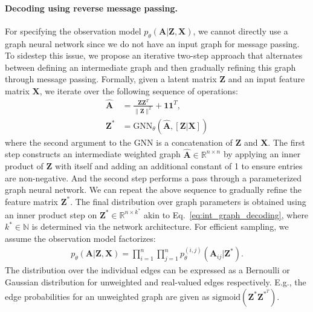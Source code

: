 \documentclass{article}
\begin{document}
\paragraph{Decoding using reverse message passing.} For specifying the observation model $p_\theta(\mathbf{A} \vert \mathbf{Z}, \mathbf{X})$, we cannot directly use a graph neural network since we do not have an input graph for message passing. To sidestep this issue, we propose an iterative two-step approach that alternates between defining an intermediate graph and then gradually refining this graph through message passing.
Formally, given a latent matrix $\mathbf{Z}$ and an input feature matrix $\mathbf{X}$, we iterate over the following sequence of operations:
\begin{align}
\widehat{\mathbf{A}} &= \frac{\mathbf{Z} \mathbf{Z}^T}{\lVert \mathbf{Z} \rVert^2} + \mathbf{1}\mathbf{1}^T,\label{eq:int_graph_decoding}\\
\mathbf{Z}^\ast &= \mathrm{GNN}_\theta(\widehat{\mathbf{A}},  [\mathbf{Z} \vert \mathbf{X}]) \label{eq:refine_graph_dec}
\end{align}
where the second argument to the GNN is a concatenation of  $\mathbf{Z}$ and $\mathbf{X}$. The first step constructs an intermediate weighted graph $\widehat{\mathbf{A}} \in \mathbb{R}^{n \times n}$ by applying an inner product of $\mathbf{Z}$ with itself and adding an additional constant of 1 to ensure entries are non-negative. 
And the second step performs a pass through a parameterized graph neural network. We can repeat the above sequence to gradually refine the feature matrix $\mathbf{Z}^\ast$. The final distribution over graph parameters is obtained using an inner product step on $\mathbf{Z}^\ast\in \mathbb{R}^{n \times k^\ast}$ akin to Eq.~\eqref{eq:int_graph_decoding}, where $k^\ast \in \mathbb{N}$ is determined via the network architecture.
For efficient sampling, we assume the observation model factorizes:
\begin{align}\label{eq:dec_mf}
p_\theta(\mathbf{A} \vert \mathbf{Z}, \mathbf{X}) = \prod_{i=1}^n \prod_{j=1}^n p_\theta^{(i,j)}(\mathbf{A}_{ij} \vert \mathbf{Z}^\ast).
\end{align}
The distribution over the individual edges can be expressed as a Bernoulli or Gaussian distribution for unweighted and real-valued edges respectively. E.g., the edge probabilities for an unweighted graph are given as $\mathrm{sigmoid}(\mathbf{Z}^\ast \mathbf{Z}^{\ast^T})$.
\end{document}
